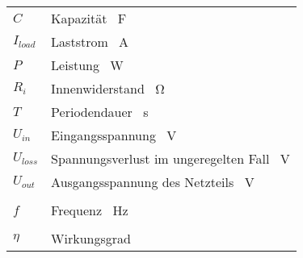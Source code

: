 \begin{table}[h]
    \begin{tabular}{@{}ll@{}}%
        \(C\) & Kapazität \SI{}{\farad}\\
        \(I_{load}\) & Laststrom \SI{}{A}\\
        \(P\) & Leistung \SI{}{W}\\
        \(R_i\) & Innenwiderstand \SI{}{\ohm}\\
        \(T\) & Periodendauer \SI{}{\second}\\
        \(U_{in}\) & Eingangsspannung \SI{}{V}\\
        \(U_{loss}\) & Spannungsverlust im ungeregelten Fall \SI{}{V}\\
        \(U_{out}\) & Ausgangsspannung des Netzteils \SI{}{V}\\
        & \\
        \(f\) & Frequenz \SI{}{\hertz}\\
        & \\
        \(\eta\) & Wirkungsgrad\\
    \end{tabular}
    \label{tab:glossar}
\end{table}